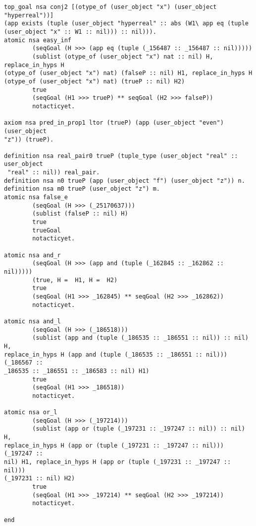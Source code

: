 \begin{verbatim}
top_goal nsa conj2 [(otype_of (user_object "x") (user_object "hyperreal"))] 
(app exists (tuple (user_object "hyperreal" :: abs (W1\ app eq (tuple 
(user_object "x" :: W1 :: nil))) :: nil))).
atomic nsa easy_inf
        (seqGoal (H >>> (app eq (tuple (_156487 :: _156487 :: nil)))))
        (sublist (otype_of (user_object "x") nat :: nil) H, replace_in_hyps H 
(otype_of (user_object "x") nat) (falseP :: nil) H1, replace_in_hyps H 
(otype_of (user_object "x") nat) (trueP :: nil) H2)
        true
        (seqGoal (H1 >>> trueP) ** seqGoal (H2 >>> falseP))
        notacticyet.

axiom nsa pred_in_prop1 ltor (trueP) (app (user_object "even") (user_object 
"z")) (trueP).

definition nsa real_pair0 trueP (tuple_type (user_object "real" :: user_object
 "real" :: nil)) real_pair.
definition nsa n0 trueP (app (user_object "f") (user_object "z")) n.
definition nsa m0 trueP (user_object "z") m.
atomic nsa false_e
        (seqGoal (H >>> (_25170637)))
        (sublist (falseP :: nil) H)
        true
        trueGoal
        notacticyet.

atomic nsa and_r
        (seqGoal (H >>> (app and (tuple (_162845 :: _162862 :: nil)))))
        (true, H =  H1, H =  H2)
        true
        (seqGoal (H1 >>> _162845) ** seqGoal (H2 >>> _162862))
        notacticyet.

atomic nsa and_l
        (seqGoal (H >>> (_186518)))
        (sublist (app and (tuple (_186535 :: _186551 :: nil)) :: nil) H, 
replace_in_hyps H (app and (tuple (_186535 :: _186551 :: nil))) (_186567 :: 
_186535 :: _186551 :: _186583 :: nil) H1)
        true
        (seqGoal (H1 >>> _186518))
        notacticyet.

atomic nsa or_l
        (seqGoal (H >>> (_197214)))
        (sublist (app or (tuple (_197231 :: _197247 :: nil)) :: nil) H, 
replace_in_hyps H (app or (tuple (_197231 :: _197247 :: nil))) (_197247 :: 
nil) H1, replace_in_hyps H (app or (tuple (_197231 :: _197247 :: nil))) 
(_197231 :: nil) H2)
        true
        (seqGoal (H1 >>> _197214) ** seqGoal (H2 >>> _197214))
        notacticyet.

end

\end{verbatim}


